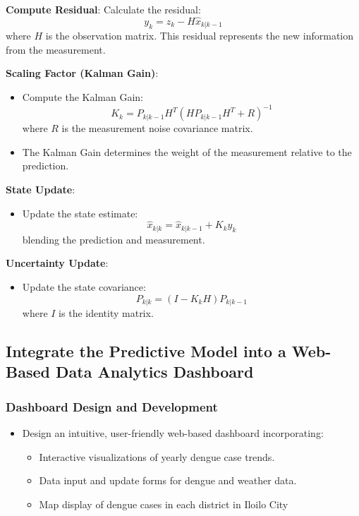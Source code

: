 \textbf{Compute Residual}: Calculate the residual:
\[
y_k = z_k - H \hat{x}_{k|k-1}
\]
where \( H \) is the observation matrix. This residual represents the new information from the measurement.

\textbf{Scaling Factor (Kalman Gain)}:
\begin{itemize}
	\item Compute the Kalman Gain:
	\[
	K_k = P_{k|k-1} H^T \left( H P_{k|k-1} H^T + R \right)^{-1}
	\]
	where \( R \) is the measurement noise covariance matrix.
	
	\item The Kalman Gain determines the weight of the measurement relative to the prediction.
\end{itemize}

\textbf{State Update}:
\begin{itemize}
	\item Update the state estimate:
	\[
	\hat{x}_{k|k} = \hat{x}_{k|k-1} + K_k y_k
	\]
	blending the prediction and measurement.
\end{itemize}

\textbf{Uncertainty Update}:
\begin{itemize}
	\item Update the state covariance:
	\[
	P_{k|k} = (I - K_k H) P_{k|k-1}
	\]
	where \( I \) is the identity matrix.
\end{itemize}

\subsection{Integrate the Predictive Model into a Web-Based Data Analytics Dashboard}

\subsubsection{Dashboard Design and Development}
\begin{itemize}
	\item Design an intuitive, user-friendly web-based dashboard incorporating:
	\begin{itemize}
		\item Interactive visualizations of yearly dengue case trends.
		\item Data input and update forms for dengue and weather data.
		\item Map display of dengue cases in each district in Iloilo City
	\end{itemize}
\end{itemize}

